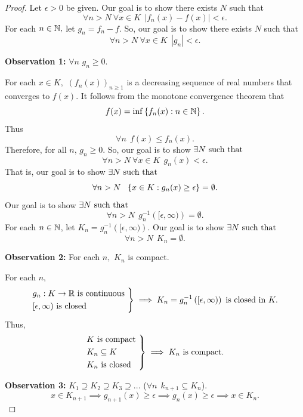 \begin{proof}
    Let $\epsilon > 0$ be given. Our goal is to show there exists $N$ such that 
    $$\forall n > N ~\forall x \in K ~~\left|f_n(x) - f(x)\right| < \epsilon.$$
    For each $n \in \mathbb{N},$ let $g_n = f_n - f.$ So, our goal is to show there exists $N$ such that 
    $$\forall n > N ~\forall x \in K ~~|g_n| < \epsilon.$$

    \textbf{Observation 1: } $\forall n$ $g_n \geq 0.$

    For each $x \in K,$ $(f_n(x))_{n \geq 1}$ is a decreasing sequence of real numbers that converges to $f(x)$. It follows from the monotone convergence theorem that
    $$f(x) = \inf \left\{f_n(x) : n \in \mathbb{N}\right\}.$$
    Thus
    $$\forall n ~~f(x) \leq f_n(x).$$
    Therefore, for all $n$, $g_n \geq 0$. So, our goal is to show $\exists N \text{ such that }$
    $$\forall n > N ~\forall x \in K ~~ g_n(x) < \epsilon.$$
    That is, our goal is to show $\exists N \text{ such that }$
    $$\forall n > N ~~\left\{x \in K : g_n(x) \geq \epsilon\right\} = \emptyset.$$
    Our goal is to show $\exists N \text{ such that }$
    $$\forall n > N ~~g_n^{-1}\left([\epsilon, \infty)\right) = \emptyset.$$
    For each $n \in \mathbb{N}$, let $K_n = g_n^{-1}\left([\epsilon, \infty)\right).$ Our goal is to show $\exists N \text{ such that }$
    $$\forall n > N ~~K_n = \emptyset.$$

    \textbf{Observation 2: } For each $n,$ $K_n$ is compact.

    For each $n,$
    \[
        \begin{rcases}
            g_n: K \to \mathbb{R} \text{ is continuous } \\
            [\epsilon , \infty) \text{ is closed}
        \end{rcases} \implies K_n = g_n^{-1}\left([\epsilon, \infty)\right) \text{ is closed in } K.
    \]
    Thus,
    \[
        \begin{rcases}
            K \text{ is compact } \\
            K_n \subseteq K \\
            K_n \text{ is closed}
        \end{rcases} \implies K_n \text{ is compact.}
    \]

    \textbf{Observation 3: } $K_1 \supseteq K_2 \supseteq K_3 \supseteq ...$ ($\forall n ~~k_{n+1} \subseteq K_n$).
    \[x \in K_{n+1} \implies g_{n+1}(x) \geq \epsilon \implies g_n(x) \geq \epsilon \implies x \in K_n.\]


\end{proof}
